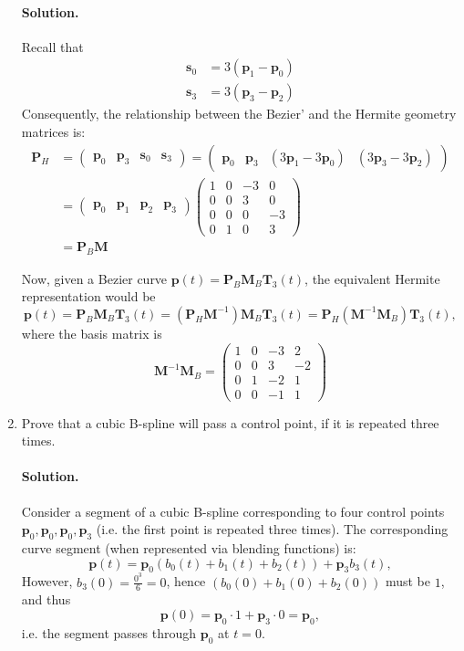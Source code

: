 \documentclass{article}
\newcommand{\bs}{\mathbf{s}}
\newcommand{\bp}{\mathbf{p}}
\newcommand{\bM}{\mathbf{M}}
\newcommand{\bP}{\mathbf{P}}
\newcommand{\bT}{\mathbf{T}}
\begin{document}
\begin{enumerate}
\paragraph{Solution.}
Recall that
\begin{align*}
\bs_0 &= 3(\bp_1-\bp_0)\\
\bs_3 &= 3(\bp_3-\bp_2)
\end{align*}
Consequently, the relationship between the Bezier' and the Hermite geometry matrices is:
\begin{align*}
\bP_H &= \left(\begin{matrix} \bp_0 & \bp_3 & \bs_0 & \bs_3\end{matrix}\right)
 = \left(\begin{matrix} \bp_0 & \bp_3 & (3\bp_1 - 3\bp_0) & (3\bp_3 - 3\bp_2)\end{matrix}\right) \\
&= \left(\begin{matrix} \bp_0 & \bp_1 & \bp_2 & \bp_3\end{matrix}\right) \left(\begin{matrix} 
1 & 0 & -3 & 0 \\ 
0 & 0 &  3 & 0 \\ 
0 & 0 &  0 & -3 \\
0 & 1 &  0 & 3
\end{matrix}\right) \\
&= \bP_B\bM
\end{align*}

Now, given a Bezier curve $\bp(t) = \bP_B\bM_B\bT_3(t)$, the equivalent Hermite representation would be
$$
\bp(t) = \bP_B\bM_B\bT_3(t) = (\bP_H\bM^{-1})\bM_B\bT_3(t)  = \bP_H(\bM^{-1}\bM_B)\bT_3(t),
$$
where the basis matrix is
$$
\bM^{-1}\bM_B = \left(\begin{matrix} 
1 & 0 & -3 & 2 \\ 
0 & 0 &  3 & -2 \\ 
0 & 1 &  -2 & 1 \\
0 & 0 &  -1 & 1
\end{matrix}\right)
$$

\item Prove that a cubic B-spline will pass a control point, if it is repeated three times.

\paragraph{Solution.}
Consider a segment of a cubic B-spline corresponding to four control points $\bp_0, \bp_0, \bp_0, \bp_3$ (i.e. the first point is repeated three times).
The corresponding curve segment (when represented via blending functions) is:
$$
\bp(t) = \bp_0 (b_0(t) + b_1(t) + b_2(t)) + \bp_3 b_3(t),
$$
However, $b_3(0) = \frac{0^3}{6} = 0$, hence $(b_0(0) + b_1(0) + b_2(0))$ must be $1$, and thus
$$
\bp(0) = \bp_0\cdot 1 + \bp_3\cdot 0 = \bp_0,
$$
i.e. the segment passes through $\bp_0$ at $t=0$.


\end{enumerate}
\end{document}
